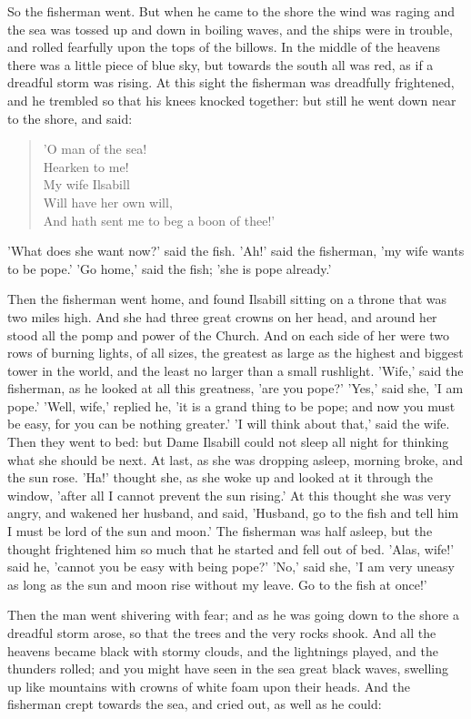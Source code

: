 \documentclass[12pt]{book}
\begin{document}
So the fisherman went. But when he came to the shore the wind was
raging and the sea was tossed up and down in boiling waves, and the
ships were in trouble, and rolled fearfully upon the tops of the
billows. In the middle of the heavens there was a little piece of blue
sky, but towards the south all was red, as if a dreadful storm was
rising. At this sight the fisherman was dreadfully frightened, and he
trembled so that his knees knocked together: but still he went down
near to the shore, and said:

\begin{verse}
 'O man of the sea!\\
  Hearken to me!\\
  My wife Ilsabill\\
  Will have her own will,\\
  And hath sent me to beg a boon of thee!'
\end{verse}

'What does she want now?' said the fish. 'Ah!' said the fisherman, 'my
wife wants to be pope.' 'Go home,' said the fish; 'she is pope
already.'

Then the fisherman went home, and found Ilsabill sitting on a throne
that was two miles high. And she had three great crowns on her head,
and around her stood all the pomp and power of the Church. And on each
side of her were two rows of burning lights, of all sizes, the
greatest as large as the highest and biggest tower in the world, and
the least no larger than a small rushlight. 'Wife,' said the
fisherman, as he looked at all this greatness, 'are you pope?' 'Yes,'
said she, 'I am pope.' 'Well, wife,' replied he, 'it is a grand thing
to be pope; and now you must be easy, for you can be nothing greater.'
'I will think about that,' said the wife. Then they went to bed: but
Dame Ilsabill could not sleep all night for thinking what she should
be next. At last, as she was dropping asleep, morning broke, and the
sun rose. 'Ha!' thought she, as she woke up and looked at it through
the window, 'after all I cannot prevent the sun rising.' At this
thought she was very angry, and wakened her husband, and said,
'Husband, go to the fish and tell him I must be lord of the sun and
moon.' The fisherman was half asleep, but the thought frightened him
so much that he started and fell out of bed. 'Alas, wife!' said he,
'cannot you be easy with being pope?' 'No,' said she, 'I am very
uneasy as long as the sun and moon rise without my leave. Go to the
fish at once!'

Then the man went shivering with fear; and as he was going down to the
shore a dreadful storm arose, so that the trees and the very rocks
shook. And all the heavens became black with stormy clouds, and the
lightnings played, and the thunders rolled; and you might have seen in
the sea great black waves, swelling up like mountains with crowns of
white foam upon their heads. And the fisherman crept towards the sea,
and cried out, as well as he could:
\end{document}
